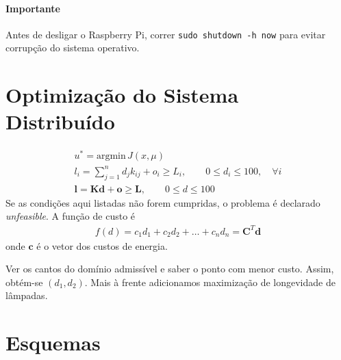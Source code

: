 \documentclass{article}
\newcommand{\matr}[1]{\mathbf{#1}}
\begin{document}
\paragraph{Importante} Antes de desligar o Raspberry Pi, correr \texttt{sudo shutdown -h now} para evitar corrupção do sistema operativo.

\section{Optimização do Sistema Distribuído}

\begin{gather*}
	u^* = \textrm{argmin}\,J(x, \mu) \\
	l_i = \sum^n_{j=1} d_j k_{ij} + o_i \geq L_i, \qquad 0 \leq d_i \leq 100, \quad \forall i \\
	\matr{l} = \matr{K}\matr{d} + \matr{o} \geq \matr{L}, \qquad 0 \leq d \leq 100
\end{gather*}
Se as condições aqui listadas não forem cumpridas, o problema é declarado \textit{unfeasible}. A função de custo é
\begin{gather*}
	f(d) = c_1d_1 + c_2d_2 + \ldots + c_nd_n = \matr{C}^T\matr{d}
\end{gather*}
onde $\matr{c}$ é o vetor dos custos de energia.

Ver os cantos do domínio admissível e saber o ponto com menor custo. Assim, obtém-se $(d_1,d_2)$. Mais à frente adicionamos maximização de longevidade de lâmpadas.
\begin{figure}[ht]
	\centering
\end{figure}

\appendix
\section{Esquemas}
\end{document}
